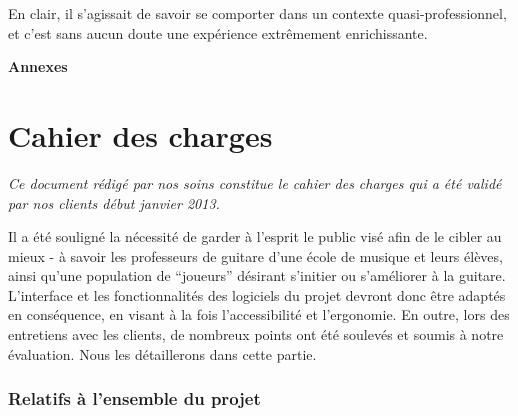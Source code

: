 \documentclass[a4paper,11pt]{article}
\begin{document}
En clair, il s'agissait de savoir se comporter dans un contexte quasi-professionnel, et c'est sans aucun doute une expérience extrêmement enrichissante.

\clearpage





















\begin{titlepage}
  \begin{center}
    \vspace{8cm}
    \Huge \textbf{Annexes}
  \end{center}
\end{titlepage}

\clearpage

\section*{Cahier des charges}\label{cdc}

\textit{Ce document rédigé par nos soins constitue le cahier des charges qui a été validé par nos clients début janvier 2013.}

\vspace{1cm}

Il a été souligné la nécessité de garder à l'esprit le public visé afin de le cibler au mieux - à savoir les professeurs de guitare d'une école de musique et leurs élèves, ainsi qu'une population de ``joueurs'' désirant s'initier ou s'améliorer à la guitare. L'interface et les fonctionnalités des logiciels du projet devront donc être adaptés en conséquence, en visant à la fois l'accessibilité et l'ergonomie. En outre, lors des entretiens avec les clients, de nombreux points ont été soulevés et soumis à notre évaluation. Nous les détaillerons dans cette partie.

\subsubsection*{Relatifs à l'ensemble du projet}
\end{document}
